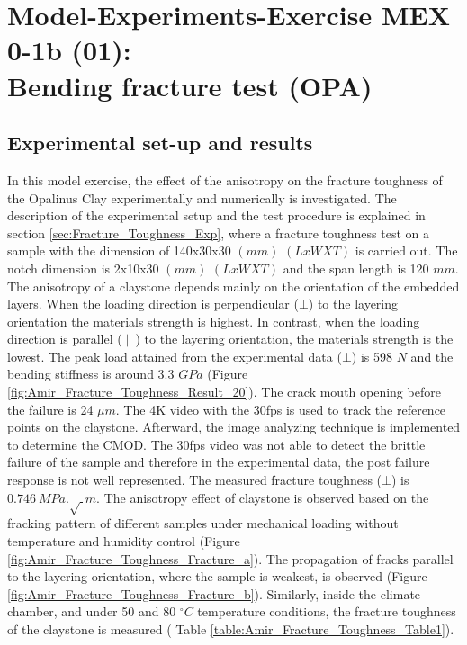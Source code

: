 \section[MEX 0-1b: Bending fracture test (OPA)]{Model-Experiments-Exercise MEX 0-1b (01):\\Bending fracture test (OPA)}
\label{sec:mex01b}

\subsection{Experimental set-up and results}

In this model exercise, the effect of the anisotropy on the fracture toughness of the Opalinus Clay experimentally and numerically is investigated. The description of the experimental setup and the test procedure is explained in section \ref{sec:Fracture_Toughness_Exp}, where a fracture toughness test on a sample with the dimension of 140x30x30 $(mm)$ $(LxWXT)$ is carried out. The notch dimension is 2x10x30 $(mm)$ $(LxWXT)$ and the span length is 120 $mm$. The anisotropy of a claystone depends mainly on the orientation of the embedded layers. When the loading direction is perpendicular ($\bot$) to the layering orientation the materials strength is highest. In contrast, when the loading direction is parallel ($\parallel$) to the layering orientation, the materials strength is the lowest. The peak load attained from the experimental data ($\bot$) is 598 $N$ and the bending stiffness is around 3.3 $GPa$ (Figure \ref{fig:Amir_Fracture_Toughness_Result_20}). The crack mouth opening before the failure is 24 $\mu m$. The 4K video with the 30fps is used to track the reference points on the claystone. Afterward, the image analyzing technique is implemented to determine the CMOD. The 30fps video was not able to detect the brittle failure of the sample and therefore in the experimental data, the post failure response is not well represented. The measured fracture toughness ($\bot$) is $0.746\ MPa.\sqrt\ m$. The anisotropy effect of claystone is observed based on the fracking pattern of different samples under mechanical loading without temperature and humidity control (Figure \ref{fig:Amir_Fracture_Toughness_Fracture_a}). The propagation of fracks parallel to the layering orientation, where the sample is weakest, is observed (Figure \ref{fig:Amir_Fracture_Toughness_Fracture_b}). Similarly, inside the climate chamber, and under 50 and 80 $^{\circ}C$ temperature conditions, the fracture toughness of the claystone is measured ( Table \ref{table:Amir_Fracture_Toughness_Table1}).

